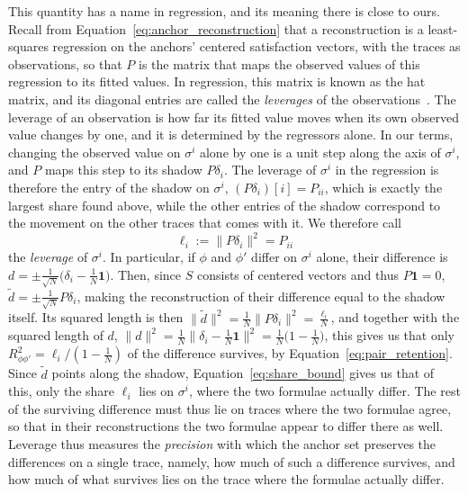 \documentclass[titlepage,a4paper,11pt]{report}
\begin{document}
    This quantity has a name in regression, and its meaning there is close to ours. Recall from Equation~\eqref{eq:anchor_reconstruction} that a reconstruction is a least-squares regression on the anchors' centered satisfaction vectors, with the traces as observations, so that $P$ is the matrix that maps the observed values of this regression to its fitted values. In regression, this matrix is known as the hat matrix, and its diagonal entries are called the \emph{leverages} of the observations~\citep{hoaglin_hat_1978}. The leverage of an observation is how far its fitted value moves when its own observed value changes by one, and it is determined by the regressors alone. In our terms, changing the observed value on $\sigma^i$ alone by one is a unit step along the axis of $\sigma^i$, and $P$ maps this step to its shadow $P\delta_i$. The leverage of $\sigma^i$ in the regression is therefore the entry of the shadow on $\sigma^i$, $(P\delta_i)[i]=P_{ii}$, which is exactly the largest share found above, while the other entries of the shadow correspond to the movement on the other traces that comes with it. We therefore call
    \begin{equation}\label{eq:leverage_def}
        \ell_i := \lVert P\delta_i\rVert^2 = P_{ii}
    \end{equation}
    the \emph{leverage} of $\sigma^i$. In particular, if $\phi$ and $\phi'$ differ on $\sigma^i$ alone, their difference is $d=\pm\frac{1}{\sqrt N}\bigl(\delta_i-\frac1N\mathbf 1\bigr)$. Then, since $S$ consists of centered vectors and thus $P\mathbf 1=0$, $\tilde d=\pm\frac{1}{\sqrt N}P\delta_i$, making the reconstruction of their difference equal to the shadow itself. Its squared length is then $\lVert\tilde d\rVert^2=\frac1N\lVert P\delta_i\rVert^2=\frac{\ell_i}{N}$, and together with the squared length of $d$, $\lVert d\rVert^2=\frac1N\bigl\lVert\delta_i-\frac1N\mathbf 1\bigr\rVert^2=\frac1N\bigl(1-\frac1N\bigr)$, this gives us that only $R^2_{\phi\phi'}=\ell_i/(1-\frac1N)$ of the difference survives, by Equation~\eqref{eq:pair_retention}. Since $\tilde d$ points along the shadow, Equation~\eqref{eq:share_bound} gives us that of this, only the share $\ell_i$ lies on $\sigma^i$, where the two formulae actually differ. The rest of the surviving difference must thus lie on traces where the two formulae agree, so that in their reconstructions the two formulae appear to differ there as well. Leverage thus measures the \emph{precision} with which the anchor set preserves the differences on a single trace, namely, how much of such a difference survives, and how much of what survives lies on the trace where the formulae actually differ.
    
\end{document}
